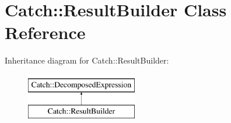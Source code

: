 \hypertarget{classCatch_1_1ResultBuilder}{}\section{Catch\+:\+:Result\+Builder Class Reference}
\label{classCatch_1_1ResultBuilder}
Inheritance diagram for Catch\+:\+:Result\+Builder\+:\begin{figure}[H]
\begin{center}
\leavevmode
\includegraphics[height=2.000000cm]{classCatch_1_1ResultBuilder}
\end{center}
\end{figure}
